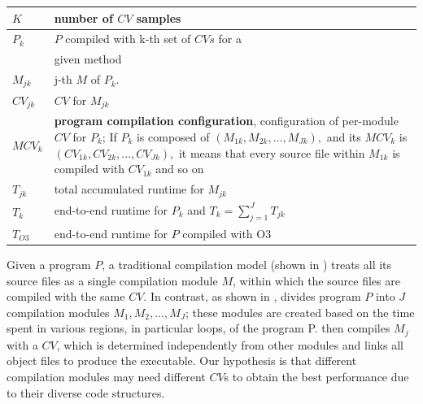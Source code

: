 \begin {table}[t]
\begin{tabular}{ p{2cm}p{14cm} }
\hline
 $K$  & number of $CV$ samples \\ \hline
 $P_k$  & $P$ compiled with k-th set of $CVs$  for a \\& given method \\ \hline
 $M_{jk}$  & j-th $M$ of $P_k$.\\ \hline
 $CV_{jk}$  & $CV$ for $M_{jk}$ \\
\hline
 $MCV_k$  & \textbf{program compilation configuration}, configuration of per-module $CV$ for $P_k$;
  If $P_k$ is composed of $(M_{1k}, M_{2k}, ..., M_{Jk}),$
  and its $MCV_k$ is $(CV_{1k}, CV_{2k}, ... ,CV_{Jk}),$ it
  means that every source file within $M_{1k}$ is
  compiled with $CV_{1k}$ and so on\\
\hline
$T_{jk}$  & total accumulated runtime for $M_{jk}$ \\
 \hline
$T_k$  & end-to-end runtime for $P_k$ and $T_k=\sum\limits_{j=1}^{J} T_{jk}$\\
\hline
$T_{O3}$  & end-to-end runtime for $P$ compiled with O3 \\
 \hline
\end{tabular}
\end {table}

Given a program $P$, a traditional compilation model (shown in
) treats all its source files as a single
compilation module $M$, within which the source files are
compiled with the same $CV$.
In contrast, as shown in , \toolname divides program $P$
into $J$ compilation modules $M_1, M_2, ..., M_J$; these modules are
created based on the time spent in various regions, in particular
loops, of the program P.  \toolname then compiles $M_j$ with a $CV$,
which is determined independently from other modules and links all
object files to produce the executable.  Our hypothesis is that
different compilation modules may need different $CV$s to obtain the
best performance due to their diverse code structures.

